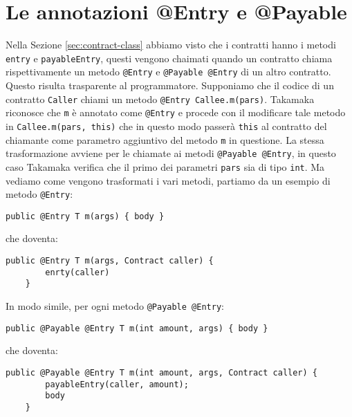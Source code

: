 \section{Le annotazioni @Entry e @Payable}
Nella Sezione \ref{sec:contract-class} abbiamo visto che i contratti hanno i metodi \lstinline|entry| e \lstinline|payableEntry|, questi vengono chaimati quando un contratto chiama rispettivamente un metodo \lstinline|@Entry| e \lstinline|@Payable @Entry| di un altro contratto. Questo risulta trasparente al programmatore. Supponiamo che il codice di un contratto \lstinline|Caller| chiami un metodo \lstinline|@Entry Callee.m(pars)|. Takamaka riconosce che \lstinline|m| è annotato come \lstinline|@Entry| e procede con il modificare tale metodo in \lstinline|Callee.m(pars, this)| che in questo modo passerà \lstinline|this| al contratto del chiamante come parametro aggiuntivo del metodo \lstinline|m| in questione. La stessa trasformazione avviene per le chiamate ai metodi \lstinline|@Payable @Entry|, in questo caso Takamaka verifica che il primo dei parametri \lstinline|pars| sia di tipo \lstinline|int|. Ma vediamo come vengono trasformati i vari metodi, partiamo da un esempio di metodo \lstinline|@Entry|:
%
\begin{lstlisting}[numbers=none,frame=none]
	public @Entry T m(args) { body }
\end{lstlisting}
%
che doventa:
%
\begin{lstlisting}[numbers=none,frame=none]
	public @Entry T m(args, Contract caller) {
		enrty(caller)
	}
\end{lstlisting}
%
In modo simile, per ogni metodo \lstinline|@Payable @Entry|:
%
\begin{lstlisting}[numbers=none,frame=none]
	public @Payable @Entry T m(int amount, args) { body }
\end{lstlisting}
%
che doventa:
%
\begin{lstlisting}[numbers=none,frame=none]
	public @Payable @Entry T m(int amount, args, Contract caller) {
		payableEntry(caller, amount);
		body
	}
\end{lstlisting}
%

